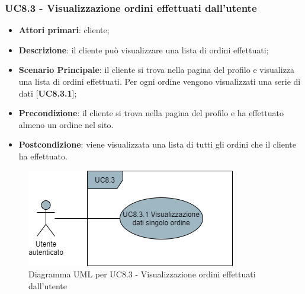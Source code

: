 \subsubsection{UC8.3 - Visualizzazione ordini effettuati dall'utente}
\begin{itemize}
\item \textbf{Attori primari}: cliente;
\item \textbf{Descrizione}: il cliente può visualizzare una lista di ordini effettuati;
\item \textbf{Scenario Principale}: il cliente si trova nella pagina del profilo e visualizza una lista di ordini effettuati. Per ogni ordine vengono visualizzati una serie di dati [\textbf{UC8.3.1}];
\item \textbf{Precondizione}: il cliente si trova nella pagina del profilo e ha effettuato almeno un ordine nel sito.
\item \textbf{Postcondizione}: viene visualizzata una lista di tutti gli ordini che il cliente ha effettuato.
\end{itemize}

\begin{figure}[H]
\centering
\includegraphics[scale=0.6]{res/UseCase/Immagini/VisualizzazioneOrdini}
\caption{Diagramma UML per UC8.3 - Visualizzazione ordini effettuati dall'utente}
\end{figure}

